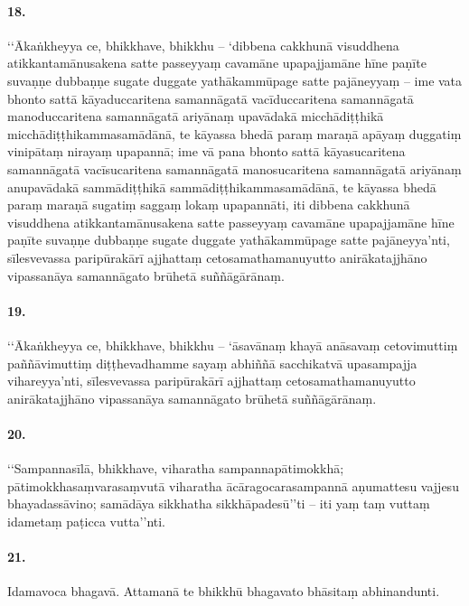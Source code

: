 \paragraph{18.} ‘‘Ākaṅkheyya ce, bhikkhave, bhikkhu – ‘dibbena cakkhunā visuddhena atikkantamānusakena satte passeyyaṃ cavamāne upapajjamāne hīne paṇīte suvaṇṇe dubbaṇṇe sugate duggate yathākammūpage satte pajāneyyaṃ – ime vata bhonto sattā kāyaduccaritena samannāgatā vacīduccaritena samannāgatā manoduccaritena samannāgatā ariyānaṃ upavādakā micchādiṭṭhikā micchādiṭṭhikammasamādānā, te kāyassa bhedā paraṃ maraṇā apāyaṃ duggatiṃ vinipātaṃ nirayaṃ upapannā; ime vā pana bhonto sattā kāyasucaritena samannāgatā vacīsucaritena samannāgatā manosucaritena samannāgatā ariyānaṃ anupavādakā sammādiṭṭhikā sammādiṭṭhikammasamādānā, te kāyassa bhedā paraṃ maraṇā sugatiṃ saggaṃ lokaṃ upapannāti, iti dibbena cakkhunā visuddhena atikkantamānusakena satte passeyyaṃ cavamāne upapajjamāne hīne paṇīte suvaṇṇe dubbaṇṇe sugate duggate yathākammūpage satte pajāneyya’nti, sīlesvevassa paripūrakārī ajjhattaṃ cetosamathamanuyutto anirākatajjhāno vipassanāya samannāgato brūhetā suññāgārānaṃ.

\paragraph{19.} ‘‘Ākaṅkheyya ce, bhikkhave, bhikkhu – ‘āsavānaṃ khayā anāsavaṃ cetovimuttiṃ paññāvimuttiṃ diṭṭhevadhamme sayaṃ abhiññā sacchikatvā upasampajja vihareyya’nti, sīlesvevassa paripūrakārī ajjhattaṃ cetosamathamanuyutto anirākatajjhāno vipassanāya samannāgato brūhetā suññāgārānaṃ.

\paragraph{20.} ‘‘Sampannasīlā, bhikkhave, viharatha sampannapātimokkhā; pātimokkhasaṃvarasaṃvutā viharatha ācāragocarasampannā aṇumattesu vajjesu bhayadassāvino; samādāya sikkhatha sikkhāpadesū’’ti – iti yaṃ taṃ vuttaṃ idametaṃ paṭicca vutta’’nti.

\paragraph{21.} Idamavoca bhagavā. Attamanā te bhikkhū bhagavato bhāsitaṃ abhinandunti.

